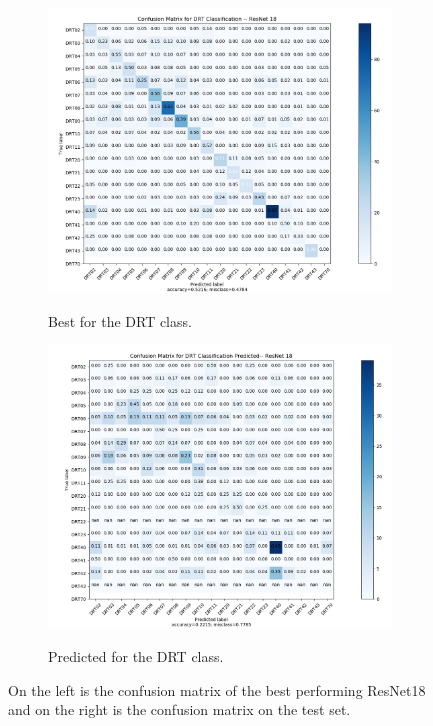 \begin{figure}
{\begin{subfigure}[b]{.6\textwidth}
\centering
\includegraphics[width=.95\textwidth]{figures/04-drt_best.PNG}
\label{fig:rescm_drt}
\caption{Best for the DRT class.}
\end{subfigure}%
\begin{subfigure}[b]{.6\textwidth}
\centering
\includegraphics[width=.95\textwidth]{figures/04-drt_pred.PNG}
\label{fig:rescm_drt_pred}
\caption{Predicted for the DRT class.}
\end{subfigure}%
}
\caption[Confusion matrices of classes trained on Resnet 18]{On the left is the confusion matrix of the best performing ResNet18 and on the right is the confusion matrix on the test set.}
\label{fig:rescm}
\end{figure}

